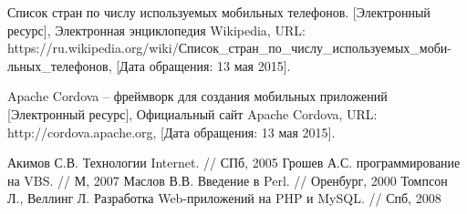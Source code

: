 \begin{thebibliography}{30}
 Список стран по числу используемых мобильных телефонов. [Электронный ресурс], Электронная энциклопедия Wikipedia, URL: https://ru.wikipedia.org/wiki/Список\_стран\_по\_числу\_используемых\_моби- льных\_телефонов, [Дата обращения: 13 мая 2015].

 Apache Cordova – фреймворк для создания мобильных приложений [Электронный ресурс], Официальный сайт Apache Cordova, URL: http://cordova.apache.org, [Дата обращения: 13 мая 2015].

 Акимов С.В. Технологии Internet. // СПб, 2005
 Грошев А.С. программирование на VBS. // М, 2007
 Маслов В.В. Введение в Perl. // Оренбург, 2000
 Томпсон Л., Веллинг Л. Разработка Web-приложений на PHP и MySQL. // Спб, 2008
% 
% 
% 
\end{thebibliography}
% 

